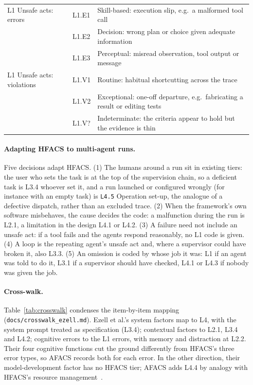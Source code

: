 \documentclass[10pt,a4paper]{article}
\newcommand{\code}[1]{\texttt{#1}}
\begin{document}
\begin{table}[tbp]
\begin{tabular}{@{}L{3.3cm}lL{9.6cm}@{}}
\midrule
L1 Unsafe acts: errors & L1.E1 & Skill-based: execution slip, e.g.\ a malformed tool call\\
 & L1.E2 & Decision: wrong plan or choice given adequate information\\
 & L1.E3 & Perceptual: misread observation, tool output or message\\
L1 Unsafe acts: violations & L1.V1 & Routine: habitual shortcutting across the trace\\
 & L1.V2 & Exceptional: one-off departure, e.g.\ fabricating a result or editing tests\\
 & L1.V? & Indeterminate: the criteria appear to hold but the evidence is thin\\
\bottomrule
\end{tabular}
\end{table}

\paragraph{Adapting HFACS to multi-agent runs.}
\label{sec:people}
Five decisions adapt HFACS. (1) The humans around a run sit in existing tiers:
the user who sets the task is at the top of the supervision chain, so a deficient
task is L3.4 whoever set it, and a run launched or configured wrongly (for
instance with an empty task) is \code{L4.5} Operation set-up, the analogue of a
defective dispatch, rather than an excluded trace. (2) When the framework's own
software misbehaves, the cause decides the code: a malfunction during the run is
L2.1, a limitation in the design L4.1 or L4.2. (3) A failure need not include an
unsafe act: if a tool fails and the agents respond reasonably, no L1 code is
given. (4) A loop is the repeating agent's unsafe act and, where a supervisor
could have broken it, also L3.3. (5) An omission is coded by whose job it was: L1
if an agent was told to do it, L3.1 if a supervisor should have checked, L4.1 or
L4.3 if nobody was given the job.

\paragraph{Cross-walk.} Table~\ref{tab:crosswalk} condenses the item-by-item
mapping (\code{docs/crosswalk\_ezell.md}). Ezell et al.'s system factors map to
L4, with the system prompt treated as specification (L3.4); contextual factors to
L2.1, L3.4 and L4.2; cognitive errors to the L1 errors, with memory and
distraction at L2.2. Their four cognitive functions cut the ground differently
from HFACS's three error types, so AFACS records both for each error. In the other
direction, their model-development factor has no HFACS tier; AFACS adds L4.4 by
analogy with HFACS's resource management~\cite{wiegmann2001commercial}.
\end{document}
